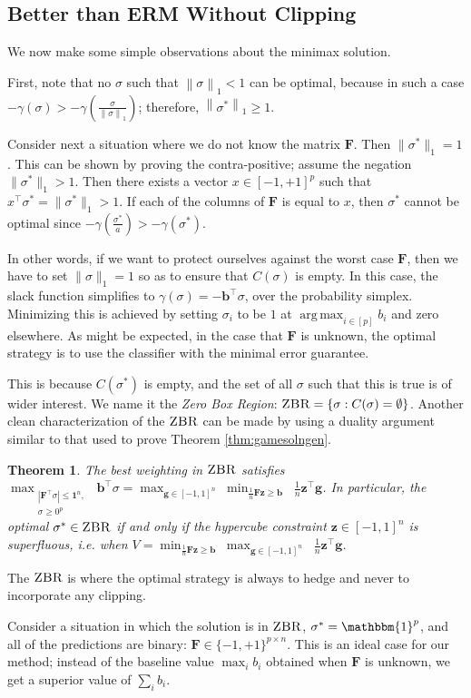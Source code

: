 \documentclass{colt2015} %
\newtheorem{thm}{Theorem}%
\newcommand{\ones}[1]{\mathbbm{1}^{#1}}
\newcommand{\vF}{\mathbf{F}}
\newcommand{\vb}{\mathbf{b}}
\newcommand{\vg}{\mathbf{g}}
\newcommand{\vz}{\mathbf{z}}
\DeclareMathOperator*{\argmax}{arg\,max}
\newcommand{\vnorm}[1]{\left\lVert#1\right\rVert} %
\newcommand{\abs}[1]{\left| #1 \right|}
\newcommand{\zbr}{\textsc{ZBR}}
\newcommand{\lrp}[1]{\left(#1\right)}
\renewcommand{\comment}[3]{\marginpar{\textcolor{#2}{#1: #3}}}
\newcommand{\yoav}[1]{\comment{Yoav}{blue}{#1}}
\begin{document}
\iffalse
\subsection{Better than ERM Without Clipping}
We now make some simple observations about the minimax solution.

First, note that no $\sigma$ such that $\vnorm{\sigma}_1 < 1$ can be optimal, 
because in such a case $-\gamma(\sigma) > -\gamma \lrp{\frac{\sigma}{\vnorm{\sigma}_1}}$; 
therefore, $\vnorm{\sigma^*}_1 \geq 1$.

Consider next a situation where we do not know the matrix $\vF$. 
Then $\|\sigma^*\|_1=1$. This can be shown by proving the contra-positive; 
assume the negation $\|\sigma^*\|_1 > 1$. Then there exists a 
vector $x \in [-1,+1]^p$ such that $x^\top \sigma^* = \|\sigma^*\|_1 > 1$. 
If each of the columns of $\vF$ is equal to $x$, 
then $\sigma^*$ cannot be optimal since 
$-\gamma \lrp{\frac{\sigma^*}{a}} > -\gamma(\sigma^*)$. 

In other words, if we want to protect ourselves against the worst case $\vF$, then
we have to set $\|\sigma\|_1=1$ so as to ensure that $C(\sigma)$ is empty. 
In this case, the slack function simplifies to $\gamma (\sigma) = - \vb^\top \sigma$, 
over the probability simplex. 
Minimizing this is achieved by setting $\sigma_i$ to be $1$ at $\displaystyle \argmax_{i \in [p]} b_i$ and zero
elsewhere. As might be expected, in the case that $\vF$ is unknown, the
optimal strategy is to use the classifier with the minimal error guarantee. 

This is because $C(\sigma^*)$ is empty, 
and the set of all $\sigma$ such that this is true is of wider interest. 
We name it the \emph{Zero Box Region}: $\zbr = \left\{ \sigma : C(\sigma) = \emptyset \right\}$.
Another clean characterization of the $\zbr$ can be made by using a 
duality argument similar to that used to prove Theorem \ref{thm:gamesolngen}. 

\begin{thm}
\label{thm:zbrunconstr}
The best weighting in $\zbr$ satisfies 
$\displaystyle \max_{\substack{ \abs{\vF^\top \sigma} \leq \mathbf{1}^n , \\ \sigma \geq 0^p }} \; \vb^\top \sigma 
= \max_{\vg \in [-1,1]^n} \;\min_{\frac{1}{n} \vF \vz \geq \vb } \;\; \frac{1}{n} \vz^\top \vg  $\;. 
In particular, the optimal $\sigma^* \in \zbr$ if and only if 
the hypercube constraint $\vz \in [-1,1]^{n}$ is superfluous, i.e. when 
$\displaystyle V = \min_{ \frac{1}{n} \vF \vz \geq \vb } \;\max_{\vg \in [-1,1]^n} \;\; \frac{1}{n} \vz^\top \vg $\;.
\end{thm}
The $\zbr$ is where the optimal strategy is always to hedge 
and never to incorporate any clipping. 

Consider a situation in which the solution is in $\zbr$, $\sigma^*=\ones{p}$, 
and all of the predictions are binary: $\vF \in \{-1,+1\}^{p \times n}$.
This is an ideal case for our method; instead of the baseline value $\max_i b_i$
obtained when $\vF$ is unknown, we get a superior value of $\sum_i b_i$. 
\end{document}

